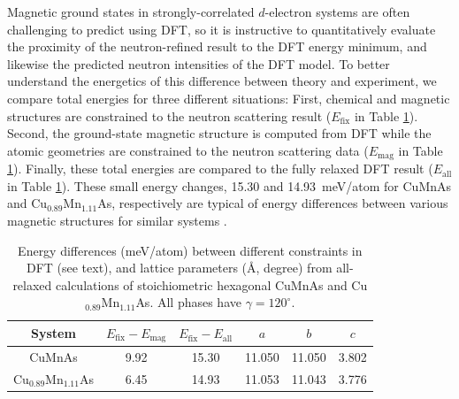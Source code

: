 \documentclass[letterpaper,10pt,doublespacing,edeposit]{uiucthesis2020}
\begin{document}
\begin{mainmatter}
Magnetic ground states in strongly-correlated $d$-electron systems are often challenging to predict using DFT,
so it is instructive to quantitatively evaluate the proximity of the neutron-refined result to the DFT energy minimum, and likewise the predicted neutron intensities of the DFT model.
To better understand the energetics of this difference between theory and experiment, we compare total energies for three different situations:
First, chemical and magnetic structures are constrained to the neutron scattering result ($E_\mathrm{fix}$ in Table \ref{tab:DFT-energy-latparam}).
Second, the ground-state magnetic structure is computed from DFT while the atomic geometries are constrained to the neutron scattering data ($E_\mathrm{mag}$ in Table \ref{tab:DFT-energy-latparam}).
Finally, these total energies are compared to the fully relaxed DFT result ($E_\mathrm{all}$ in Table \ref{tab:DFT-energy-latparam}).
These small energy changes, 15.30 and 14.93~meV/atom for CuMnAs and Cu$_{0.89}$Mn$_{1.11}$As, respectively are typical of energy differences between various magnetic structures for similar systems \cite{Alsolami2012Auth}.

\begin{table}
\caption{\label{tab:DFT-energy-latparam} 
Energy differences (meV/atom) between different constraints in DFT (see text), and lattice parameters (\AA, degree) from all-relaxed calculations of stoichiometric hexagonal CuMnAs and Cu$_{0.89}$Mn$_{1.11}$As. All phases have $\gamma = 120^\circ$.
}
\centering
\begin{tabular}{cccccc}
\hline\hline
System	 & $E_\mathrm{fix}-E_\mathrm{mag}$	 & $E_\mathrm{fix}-E_\mathrm{all}$	 & $a$	 & $b$	 & $c$ \\
\hline
CuMnAs	 & 9.92	 & 15.30	 & 11.050	 & 11.050	 & 3.802\\
Cu$_{0.89}$Mn$_{1.11}$As	 & 6.45	 & 14.93	 & 11.053	 & 11.043	 & 3.776\\
\hline \hline
\end{tabular}
~\\
\end{table}


\end{mainmatter}
\end{document}
